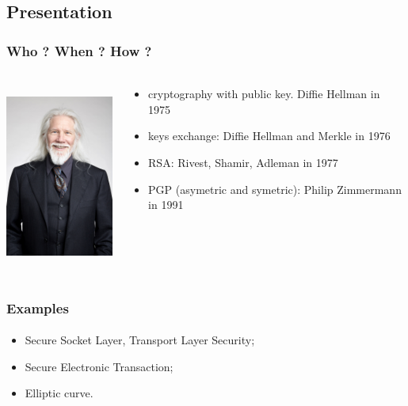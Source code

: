 \documentclass[]{beamer}
\begin{document}
\subsection{Presentation}
\begin{frame}
\frametitle{Who ? When ? How ?}
\framesubtitle{}
\begin{columns}
\begin{column}{5cm}
\begin{center}
\includegraphics[height=6.0cm, width=4.0cm]{./images/Whitfield_Diffie_Royal_Society.jpg}
\end{center}
\end{column}
\begin{column}{5cm}
\begin{itemize}
    \item cryptography with public key. Diffie Hellman in 1975
    \item keys exchange: Diffie Hellman and Merkle in 1976
    \item RSA: Rivest, Shamir, Adleman in 1977
    \item PGP (asymetric and symetric): Philip Zimmermann in 1991
\end{itemize}
\end{column}
\end{columns}
\end{frame}

\begin{frame}
\frametitle{Examples}
\framesubtitle{}
\begin{itemize}
    \item Secure Socket Layer, Transport Layer Security;
    \item Secure Electronic Transaction;
    \item Elliptic curve.
\end{itemize}
\end{frame}
\end{document}
